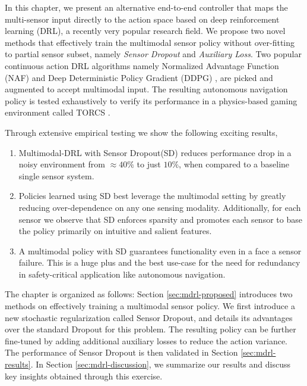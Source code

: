 \documentclass[../thesis.tex]{subfiles}
\begin{document}
 
In this chapter, we present an alternative end-to-end controller that maps the multi-sensor input directly to the action space based on deep reinforcement learning (DRL), a recently very popular research field.
We propose two novel methods that effectively train the multimodal sensor policy without over-fitting to partial sensor subset, namely \textit{Sensor Dropout} and \textit{Auxiliary Loss}.
Two popular continuous action DRL algorithms namely Normalized Advantage Function (NAF) \cite{CDQN} and Deep Deterministic Policy Gradient (DDPG) \cite{DBLP:journals/corr/LillicrapHPHETS15}, are picked and augmented to accept multimodal input. The resulting autonomous navigation policy is tested exhaustively to verify its performance in a physics-based gaming environment called TORCS \cite{wymann2000torcs}.
 
Through extensive empirical testing we show the following exciting results,
\begin{enumerate}
 
    	\item Multimodal-DRL with Sensor Dropout(SD) reduces performance drop in a noisy environment from $\approx 40\%$ to just $10\%$, when compared to a baseline single sensor system.
    	
    	\item Policies learned using SD best leverage the multimodal setting by greatly reducing over-dependence on any one sensing modality. Additionally, for each sensor we observe that SD enforces sparsity and promotes each sensor to base the policy primarily on intuitive and salient features.
    	
    	\item A multimodal policy with SD guarantees functionality even in a face a sensor failure. This is a huge plus and the best use-case for the need for redundancy in safety-critical application like autonomous navigation.
 
\end{enumerate}
 
 
The chapter is organized as follows:
Section \ref{sec:mdrl-proposed} introduces two methods on effectively training a multimodal sensor policy. We first introduce a new stochastic regularization called Sensor Dropout, and details its advantages over the standard Dropout for this problem. The resulting policy can be further fine-tuned by adding additional auxiliary losses to reduce the action variance. The performance of Sensor Dropout is then validated in Section \ref{sec:mdrl-results}. In Section \ref{sec:mdrl-discussion}, we summarize our results and discuss key insights obtained through this exercise.
 
\end{document}
